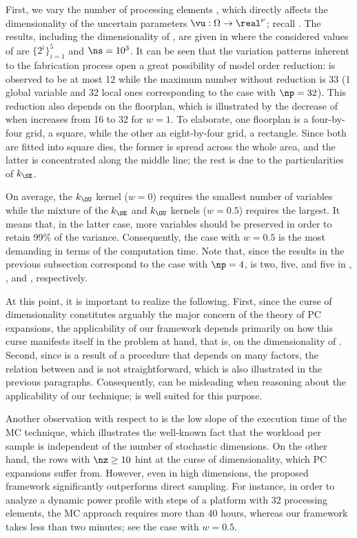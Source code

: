 First, we vary the number of processing elements \np, which directly affects the
dimensionality of the uncertain parameters $\vu: \Omega \to \real^\nu$; recall
. The results, including the dimensionality
\nz of \vz, are given in  where the
considered values of \np are $\{ 2^i \}_{i = 1}^5$ and $\ns = 10^3$. It can be
seen that the variation patterns inherent to the fabrication process
\cite{cheng2011} open a great possibility of model order reduction: \nz is
observed to be at most 12 while the maximum number without reduction is 33 (1
global variable and 32 local ones corresponding to the case with $\np = 32$).
This reduction also depends on the floorplan, which is illustrated by the
decrease of \nz when \np increases from 16 to 32 for $w = 1$. To elaborate, one
floorplan is a four-by-four grid, a square, while the other an eight-by-four
grid, a rectangle. Since both are fitted into square dies, the former is spread
across the whole area, and the latter is concentrated along the middle line; the
rest is due to the particularities of $k_\SE$.

On average, the $k_\OU$ kernel ($w = 0$) requires the smallest number of
variables while the mixture of the $k_\SE$ and $k_\OU$ kernels ($w = 0.5$)
requires the largest. It means that, in the latter case, more variables should
be preserved in order to retain 99\% of the variance. Consequently, the case
with $w = 0.5$ is the most demanding in terms of the computation time. Note
that, since the results in the previous subsection correspond to the case with
$\np = 4$, \nz is two, five, and five in ,
, and ,
respectively.

At this point, it is important to realize the following. First, since the curse
of dimensionality constitutes arguably the major concern of the theory of
\ac{PC} expansions, the applicability of our framework depends primarily on how
this curse manifests itself in the problem at hand, that is, on the
dimensionality \nz of \vz. Second, since \vz is a result of a procedure that
depends on many factors, the relation between \vu and \vz is not
straightforward, which is also illustrated in the previous paragraphs.
Consequently, \nu can be misleading when reasoning about the applicability of
our technique; \nz is well suited for this purpose.

Another observation with respect to  is the
low slope of the execution time of the \ac{MC} technique, which illustrates the
well-known fact that the workload per sample is independent of the number of
stochastic dimensions. On the other hand, the rows with $\nz \geq 10$ hint at
the curse of dimensionality, which \ac{PC} expansions suffer from. However, even
in high dimensions, the proposed framework significantly outperforms direct
sampling. For instance, in order to analyze a dynamic power profile with
 steps of a platform with 32 processing elements, the \ac{MC}
approach requires more than 40 hours, whereas our framework takes less than two
minutes; see the case with $w = 0.5$.


